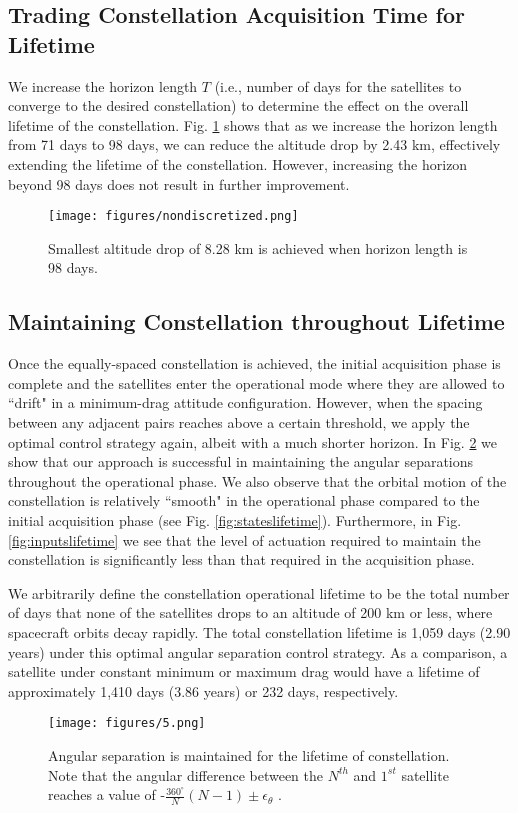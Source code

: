 \documentclass[letterpaper, 10 pt, conference]{ieeeconf}  %
\begin{document}
\subsection{Trading Constellation Acquisition Time for Lifetime}

We increase the horizon length $T$ (i.e., number of days for the satellites to converge to the desired constellation) to determine the effect on the overall lifetime of the constellation. Fig. \ref{fig: varyinghorizonlength} shows that as we increase the horizon length from 71 days to 98 days, we can reduce the altitude drop by 2.43 km, effectively extending the lifetime of the constellation. However, increasing the horizon beyond 98 days does not result in further improvement.

\begin{figure}[h]
\centering
\texttt{[image: figures/nondiscretized.png]}
\caption{Smallest altitude drop of 8.28 km is achieved when horizon length is 98 days.}
\label{fig: varyinghorizonlength}
\end{figure}

\subsection{Maintaining Constellation throughout Lifetime}

Once the equally-spaced constellation is achieved, the initial acquisition phase is complete and the satellites enter the operational mode where they are allowed to ``drift" in a minimum-drag attitude configuration. However, when the spacing between any adjacent pairs reaches above a certain threshold, we apply the optimal control strategy again, albeit with a much shorter horizon. In Fig. \ref{fig:spacinglifetime} we show that our approach is successful in maintaining the angular separations throughout the operational phase. We also observe that the orbital motion of the constellation is relatively ``smooth" in the operational phase compared to the initial acquisition phase (see Fig. \ref{fig:stateslifetime}). Furthermore, in Fig. \ref{fig:inputslifetime} we see that the level of actuation required to maintain the constellation is significantly less than that required in the acquisition phase. 

We arbitrarily define the constellation operational lifetime to be the total number of days that none of the satellites drops to an altitude of 200 km or less, where spacecraft orbits decay rapidly. The total constellation lifetime is 1,059 days (2.90 years) under this optimal angular separation control strategy. As a comparison, a satellite under constant minimum or maximum drag would have a lifetime of approximately 1,410 days (3.86 years) or 232 days, respectively. 
\begin{figure}[h]
\centering
\texttt{[image: figures/5.png]}
\caption{Angular separation is maintained for the lifetime of constellation. Note that the angular difference between the $N^{th}$ and $1^{st}$ satellite reaches a value of -$\frac{360^{\circ}}{N}(N-1) \pm \epsilon_{\theta}$ .}
\label{fig:spacinglifetime}
\end{figure}
\end{document}
